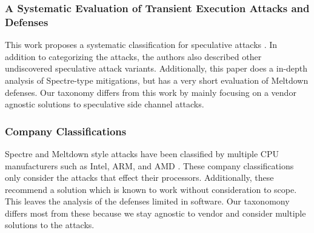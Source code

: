 \subsubsection{A Systematic Evaluation of Transient Execution Attacks and Defenses}

This work proposes a systematic classification for speculative attacks \cite{b48}. 
In addition to categorizing the attacks, the authors also described other undiscovered speculative attack variants.
Additionally, this paper does a in-depth analysis of Spectre-type mitigations, but has a very short evaluation of Meltdown defenses.
Our taxonomy differs from this work by mainly focusing on a vendor agnostic solutions to speculative side channel attacks.

\subsubsection{Company Classifications}

Spectre and Meltdown style attacks have been classified by multiple CPU manufacturers such as Intel, ARM, and AMD \cite{b54, b16, b53}.
These company classifications only consider the attacks that effect their processors.
Additionally, these recommend a solution which is known to work without consideration to scope.
This leaves the analysis of the defenses limited in software.
Our taxonomony differs most from these because we stay agnostic to vendor and consider multiple solutions to the attacks. 
